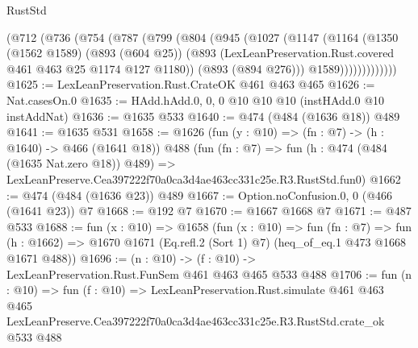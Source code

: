 \begin{lexlean}{RustStd}
\begin{coremodule}
          (@712
            (@736
              (@754
                (@787
                  (@799
                    (@804
                      (@945
                        (@1027
                          (@1147
                            (@1164
                              (@1350
                                (@1562 @1589)
                                (@893 (@604 @25))
                                (@893
                                  (LexLeanPreservation.Rust.covered @461 @463 @25 @1174 @127 @1180))
                                (@893 (@894 @276)))
                              @1589)))))))))))))
@1625 := LexLeanPreservation.Rust.CrateOK @461 @463 @465
@1626 := Nat.casesOn.{0}
@1635 := HAdd.hAdd.{0, 0, 0} @10 @10 @10 (instHAdd.{0} @10 instAddNat)
@1636 := @1635 @533
@1640 := @474 (@484 (@1636 @18)) @489
@1641 := @1635 @531
@1658 := @1626
    (fun (y : @10) => (fn : @7) -> (h : @1640) -> @466 (@1641 @18))
    @488
    (fun (fn : @7) =>
    fun (h : @474 (@484 (@1635 Nat.zero @18)) @489) =>
    LexLeanPreserve.Cea397222f70a0ca3d4ae463cc331c25e.R3.RustStd.fun0)
@1662 := @474 (@484 (@1636 @23)) @489
@1667 := Option.noConfusion.{0, 0} (@466 (@1641 @23)) @7
@1668 := @192 @7
@1670 := @1667 @1668 @7
@1671 := @487 @533
@1688 := fun (x : @10) =>
  @1658
    (fun (x : @10) =>
    fun (fn : @7) =>
    fun (h : @1662) => @1670 @1671 (Eq.refl.{2} (Sort 1) @7) (heq_of_eq.{1} @473 @1668 @1671 @488))
@1696 := (n : @10) -> (f : @10) -> LexLeanPreservation.Rust.FunSem @461 @463 @465 @533 @488
@1706 := fun (n : @10) =>
  fun (f : @10) =>
  LexLeanPreservation.Rust.simulate
    @461
    @463
    @465
    LexLeanPreserve.Cea397222f70a0ca3d4ae463cc331c25e.R3.RustStd.crate_ok
    @533
    @488
\end{coremodule}
\end{lexlean}
